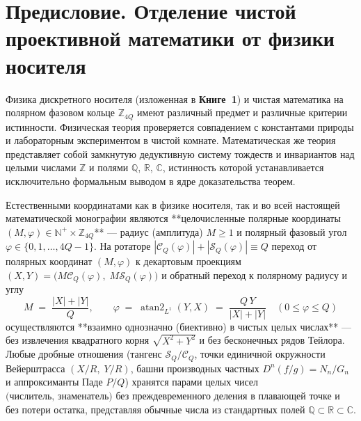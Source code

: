 
\chapter*{Предисловие. Отделение чистой проективной математики от физики носителя}

Физика дискретного носителя (изложенная в \textbf{Книге~1}) и чистая математика на полярном фазовом кольце $\mathbb{Z}_{4Q}$ имеют различный предмет и различные критерии истинности. Физическая теория проверяется совпадением с константами природы и лабораторным экспериментом в чистой комнате. Математическая же теория представляет собой замкнутую дедуктивную систему тождеств и инвариантов над целыми числами $\mathbb{Z}$ и полями $\mathbb{Q}$, $\mathbb{R}$, $\mathbb{C}$, истинность которой устанавливается исключительно формальным выводом в ядре доказательства теорем.

Естественными координатами как в физике носителя, так и во всей настоящей математической монографии являются **целочисленные полярные координаты $(M, \varphi) \in \mathbb{N}^+ \times \mathbb{Z}_{4Q}$** --- радиус (амплитуда) $M \ge 1$ и полярный фазовый угол $\varphi \in \{0, 1, \dots, 4Q-1\}$. На ротаторе $|\mathcal{C}_Q(\varphi)| + |\mathcal{S}_Q(\varphi)| \equiv Q$ переход от полярных координат $(M, \varphi)$ к декартовым проекциям $(X, Y) = \bigl(M\mathcal{C}_Q(\varphi),\; M\mathcal{S}_Q(\varphi)\bigr)$ и обратный переход к полярному радиусу и углу
\[
  M \;=\; \frac{|X| + |Y|}{Q}, \qquad \varphi \;=\; \operatorname{atan2}_{L^1}(Y, X) \;=\; \frac{Q\,Y}{|X| + |Y|} \quad (0 \le \varphi \le Q)
\]
осуществляются **взаимно однозначно (биективно) в чистых целых числах** --- без извлечения квадратного корня $\sqrt{X^2+Y^2}$ и без бесконечных рядов Тейлора. Любые дробные отношения (тангенс $\mathcal{S}_Q/\mathcal{C}_Q$, точки единичной окружности Вейерштрасса $(X/R,\; Y/R)$, башни производных частных $D^n(f/g) = N_n/G_n$ и аппроксиманты Паде $P/Q$) хранятся парами целых чисел $\text{(числитель, знаменатель)}$ без преждевременного деления в плавающей точке и без потери остатка, представляя обычные числа из стандартных полей $\mathbb{Q} \subset \mathbb{R} \subset \mathbb{C}$.

